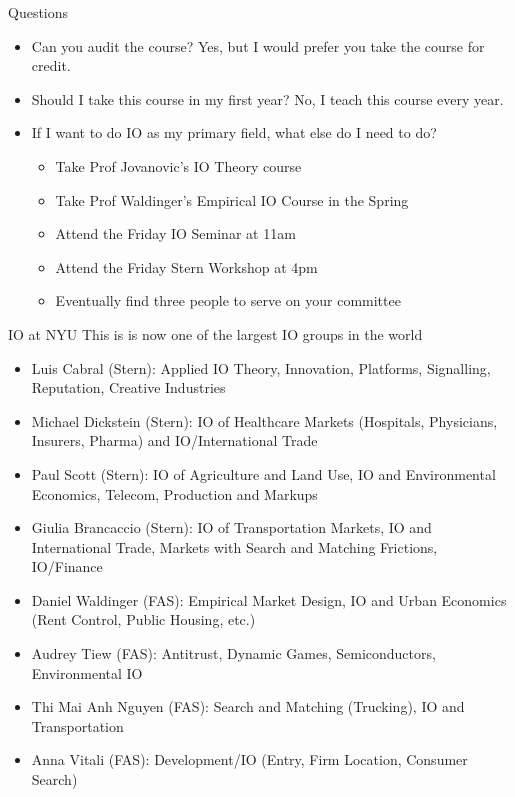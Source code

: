 \begin{frame}{Questions}
\begin{itemize}
    \item Can you audit the course? Yes, but I would prefer you take the course for credit.
    \item Should I take this course in my first year? No, I teach this course every year.
    \item If I want to do IO as my primary field, what else do I need to do?
    \begin{itemize}
        \item Take Prof Jovanovic's IO Theory course
        \item Take Prof Waldinger's Empirical IO Course in the Spring
        \item Attend the Friday IO Seminar at 11am
        \item Attend the Friday Stern Workshop at 4pm
        \item Eventually find three people to serve on your committee
    \end{itemize}
\end{itemize}
\end{frame}



\begin{frame}{IO at NYU}
This is is now one of the largest IO groups in the world
\begin{itemize}
    \item Luis Cabral (Stern): Applied IO Theory, Innovation, Platforms, Signalling, Reputation, Creative Industries
    \item Michael Dickstein (Stern): IO of Healthcare Markets (Hospitals, Physicians, Insurers, Pharma) and IO/International Trade
    \item Paul Scott (Stern): IO of Agriculture and Land Use, IO and Environmental Economics, Telecom, Production and Markups
    \item Giulia Brancaccio (Stern): IO of Transportation Markets, IO and International Trade, Markets with Search and Matching Frictions, IO/Finance
    \item Daniel Waldinger (FAS): Empirical Market Design, IO and Urban Economics (Rent Control, Public Housing, etc.)
    \item Audrey Tiew (FAS): Antitrust, Dynamic Games, Semiconductors, Environmental IO
    \item Thi Mai Anh Nguyen (FAS): Search and Matching (Trucking), IO and Transportation
    \item Anna Vitali (FAS): Development/IO (Entry, Firm Location, Consumer Search)
\end{itemize}
\end{frame}

